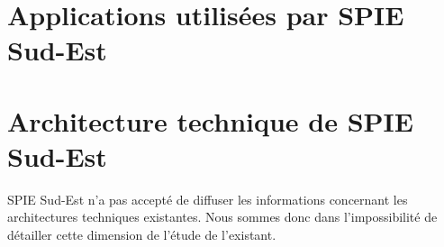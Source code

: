 \section{Applications utilisées par SPIE Sud-Est}



\section{Architecture technique de SPIE Sud-Est}

SPIE Sud-Est n'a pas accepté de diffuser les informations concernant les architectures techniques existantes. Nous sommes donc dans l'impossibilité de détailler cette dimension de l'étude de l'existant.